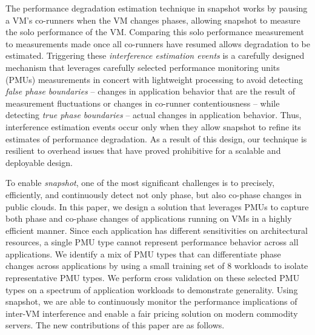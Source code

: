 \documentclass{sig-alternate}
\begin{document}
The performance degradation estimation technique in snapshot works by pausing a VM's co-runners when the VM changes phases, allowing snapshot to measure the solo performance of the VM. Comparing this solo performance measurement to measurements made once all co-runners have resumed allows degradation to be estimated. Triggering these \emph{interference estimation events} is a carefully designed mechanism that leverages carefully selected performance monitoring units (PMUs) measurements in concert with lightweight processing to avoid detecting \emph{false phase boundaries} -- changes in application behavior that are the result of measurement fluctuations or changes in co-runner contentiousness -- while detecting \emph{true phase boundaries} -- actual changes in application behavior. Thus, interference estimation events occur only when they allow snapshot to refine its estimates of performance degradation. As a result of this design, our technique is resilient to overhead issues that have proved prohibitive for a scalable and deployable design.

To enable \textit{snapshot}, one of the most significant challenges is to precisely, efficiently, and continuously detect not only phase, but also co-phase changes in public clouds. In this paper, we design a solution that leverages PMUs to capture both phase and co-phase changes of applications running on VMs in a highly efficient manner. Since each application has different sensitivities on architectural resources, a single PMU type cannot represent performance behavior across all applications. We identify a mix of PMU types that can differentiate phase changes across applications by using a small training set of 8 workloads to isolate representative PMU types. We perform cross validation on these selected PMU types on a spectrum of application workloads to demonstrate generality. Using snapshot, we are able to continuously monitor the performance implications of inter-VM interference and enable a fair pricing solution on modern commodity servers. The new contributions of this paper are as follows.
\end{document}
